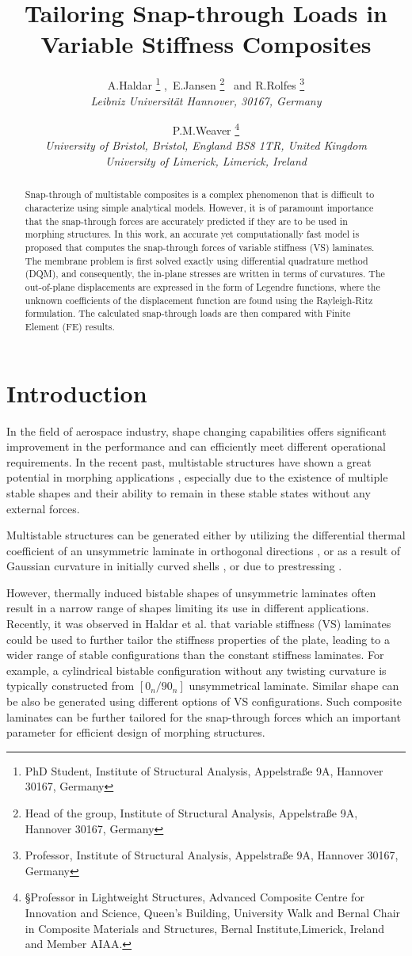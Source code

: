 \documentclass[journal]{new-aiaa}
\title{Tailoring Snap-through Loads in Variable Stiffness Composites }
\author{
     A.Haldar%
    \thanks{PhD Student, Institute of Structural Analysis, Appelstraße 9A, Hannover 30167, Germany}
  ,\ E.Jansen%
  \thanks{Head of the group, Institute of Structural Analysis, Appelstraße 9A,  Hannover 30167, Germany}
  \ and R.Rolfes%
  \thanks{Professor, Institute of Structural Analysis, Appelstraße 9A,  Hannover 30167, Germany}
  \\
  {\normalsize\itshape
   Leibniz Universität Hannover, 30167, Germany}\\
  \and
  P.M.Weaver%
   \thanks{§Professor in Lightweight Structures, Advanced Composite Centre for Innovation and Science, Queen’s Building, University Walk and Bernal Chair in Composite Materials and Structures, Bernal Institute,Limerick, Ireland and Member AIAA.}\\
  {\normalsize\itshape
  University of Bristol, Bristol, England BS8 1TR, United Kingdom}\\
 {\normalsize\itshape University of Limerick, Limerick, Ireland}
}
\begin{document}
\maketitle

\begin{abstract}
Snap-through of multistable composites is a complex phenomenon that is difficult to characterize using simple analytical models. However, it is of paramount importance that the snap-through forces are accurately predicted if they are to be used in morphing structures. In this work, an accurate yet computationally fast model is proposed that computes the snap-through forces of variable stiffness (VS) laminates. The membrane problem is first solved exactly using differential quadrature method (DQM), and consequently, the in-plane stresses are written in terms of curvatures. The out-of-plane displacements are expressed in the form of Legendre functions, where the unknown coefficients of the displacement function are found using the Rayleigh-Ritz formulation. The calculated snap-through loads are then compared with Finite Element (FE) results.
\end{abstract}

\section{Introduction}

In the field of aerospace	 industry, shape changing capabilities offers significant improvement in the performance and can efficiently meet different operational requirements. In the recent past, multistable structures have shown a great potential in morphing applications \cite{Schultz2007,Mattioni2008application,Arrieta2014,Daynes2009,Diaconu2008}, especially due to the existence of multiple stable shapes and their ability to remain in these stable states without any external forces.

Multistable structures can be generated either by utilizing the differential thermal coefficient of an unsymmetric laminate in orthogonal directions \cite{Hyer1981}, or as a result of Gaussian curvature in initially curved shells \cite{seffen2007}, or due to prestressing \cite{Daynes2009}. 

However, thermally induced bistable shapes of unsymmetric laminates often result in a narrow range of shapes limiting its use in different applications. Recently, it was observed in Haldar et al. \cite{Haldar2017}
that variable stiffness (VS) laminates could be used to further tailor the stiffness properties of the plate, leading to a wider range of stable configurations than the constant stiffness laminates. For example, a cylindrical bistable configuration without any twisting curvature is typically constructed from $[0_n/90_n]$ unsymmetrical laminate. Similar shape can be also be generated using different options of VS configurations. Such composite laminates can be further tailored for the snap-through forces which an important parameter for efficient design of morphing structures.
\end{document}
